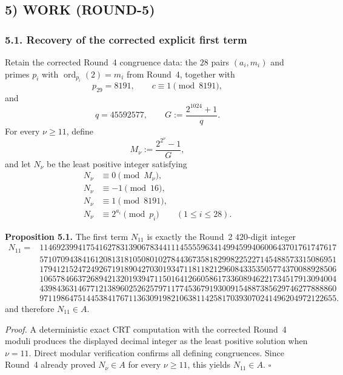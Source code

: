 \subsection*{5) WORK (ROUND-5)}

\subsubsection*{5.1. Recovery of the corrected explicit first term}

Retain the corrected Round~4 congruence data:
the $28$ pairs $(a_i,m_i)$ and primes $p_i$ with $\operatorname{ord}_{p_i}(2)=m_i$ from Round~4, together with
\[
p_{29}=8191,\qquad c\equiv 1\pmod{8191},
\]
and
\[
q=45592577,\qquad G:=\frac{2^{1024}+1}{q}.
\]
For every $\nu\ge 11$, define
\[
M_\nu:=\frac{2^{2^\nu}-1}{G},
\]
and let $N_\nu$ be the least positive integer satisfying
\begin{align*}
N_\nu&\equiv 0\pmod{M_\nu},\\
N_\nu&\equiv -1\pmod{16},\\
N_\nu&\equiv 1\pmod{8191},\\
N_\nu&\equiv 2^{a_i}\pmod{p_i}\qquad (1\le i\le 28).
\end{align*}

\medskip
\noindent\textbf{Proposition 5.1.}
The first term $N_{11}$ is exactly the Round~2 $420$-digit integer
\[
\begin{aligned}
N_{11}={}&1146923994175416278313906783441114555596341499459940600643701761747617\\
&5710709438416120813181050801027844367358182998225227145488573315086951\\
&1794121524724926719189042703019347118118212960843353505774370088928506\\
&1065784663726894213201939471150164126605861733608946221734517913094004\\
&4398436314677121389602526257971177453679193009154887385629746277888860\\
&9711986475144538417671136309198210638114258170393070241496204972122655.
\end{aligned}
\]
and therefore $N_{11}\in A$.

\medskip
\noindent\emph{Proof.}
A deterministic exact CRT computation with the corrected Round~4 moduli produces the displayed decimal integer as the least positive solution when $\nu=11$.
Direct modular verification confirms all defining congruences.
Since Round~4 already proved $N_\nu\in A$ for every $\nu\ge 11$, this yields $N_{11}\in A$. \hfill$\square$

